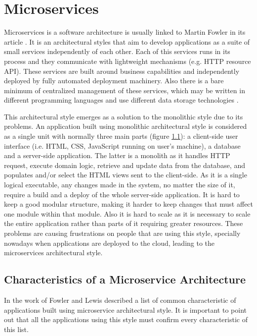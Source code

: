 \section{Microservices}

Microservices is a software architecture is usually linked to Martin Fowler in its article \citep{Fowler2014}. It is an architectural styles that aim to develop applications as a suite of small services independently of each other. Each of this services runs in its process and they communicate with lightweight mechanisms (e.g. HTTP resource API). These services are built around business capabilities and independently deployed by fully automated deployment machinery. Also there is a bare minimum of centralized management of these services, which may be written in different programming languages and use different data storage technologies \citep{Fowler2014}.

This architectural style emerges as a solution to the monolithic style due to its problems. An application built using monolithic architectural style is considered as a single unit with normally three main parts (figure \ref{}): a client-side user interface (i.e. HTML, CSS, JavaScript running on user's machine), a database and a server-side application. The latter is a monolith as it handles HTTP request, execute domain logic, retrieve and update data from the database, and populates and/or select the HTML views sent to the client-side. As it is a single logical executable, any changes made in the system, no matter the size of it, require a build and a deploy of the whole server-side application. It is hard to keep a good modular structure, making it harder to keep changes that must affect one module within that module. Also it is hard to scale as it is necessary to scale the entire application rather than parts of it requiring greater resources. These problems are causing frustrations on people that are using this style, specially nowadays when applications are deployed to the cloud, leading to the microservices architectural style.

\subsection{Characteristics of a Microservice Architecture}
In the work of Fowler and Lewis \citep{Fowler2014} described a list of common characteristic of applications built using microservice architectural style. It is important to point out that all the applications using this style must confirm every characteristic of this list.

